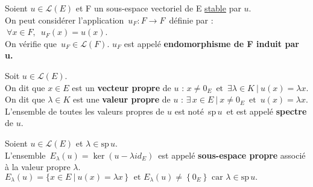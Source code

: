 \vspace{1.5cm}

Soient \(u\in \mathscr{L}(E)\) et F un sous-espace vectoriel de E \underline{stable} par $u$.\\
On peut considérer l'application \(\,u_F :F \to F\,\) définie par : \(\ \forall x\in F,\ \;u_F(x)=u(x)\).\\
On vérifie que \(\,u_F\in \mathscr{L}(F)\). $u_F$ est appelé \textbf{endomorphisme de F induit par u.}

\newpage

Soit \(u\in \mathscr{L}(E)\).\\
On dit que \(x\in E\) est un \textbf{vecteur propre} de $u$ \ssi : \(x\neq 0_E\, \text{ et }\, \exists \lambda \in K \ \vert \ u(x)=\lambda x.\)\\
On dit que \(\lambda \in K\) est une \textbf{valeur propre} de $u$ \ssi : \(\exists\, x\in E \ \vert \ x\neq 0_E \, \text{ et }\,  u(x)=\lambda x.\)\\
L'ensemble de toutes les valeurs propres de $u$ est noté\, sp$\,u\,$ et est appelé \textbf{spectre} de $u$.

\vspace{1.3cm}

Soient \(u\in \mathscr{L}(E)\) et \(\lambda \in \text{sp}\,u.\)\vspace{0.1cm}\\
L'ensemble \(\,E_\lambda(u)=\ker (u-\lambda id_E)\,\) est appelé \textbf{sous-espace propre} associé à la valeur propre $\lambda$.\vspace{0.1cm}
\(E_\lambda(u)=\{x\in E \ \vert \ u(x)=\lambda x\,\}\; \text{ et } E_\lambda(u)\neq \left\{0_E\right\} \text{ car } \lambda\in \text{sp}\,u.\) 

\vspace{1.3cm}


